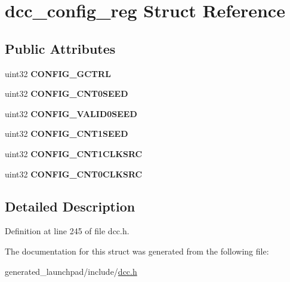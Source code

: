\hypertarget{structdcc__config__reg}{}\section{dcc\+\_\+config\+\_\+reg Struct Reference}
\label{structdcc__config__reg}
\subsection*{Public Attributes}
\begin{DoxyCompactItemize}
\item 
\mbox{\label{structdcc__config__reg_a8f7e1439184c35b567b12efd426e41fb}} 
uint32 {\bfseries C\+O\+N\+F\+I\+G\+\_\+\+G\+C\+T\+RL}
\item 
\mbox{\label{structdcc__config__reg_acd374e538423583537034cb9b4633c55}} 
uint32 {\bfseries C\+O\+N\+F\+I\+G\+\_\+\+C\+N\+T0\+S\+E\+ED}
\item 
\mbox{\label{structdcc__config__reg_afdf5149c435370be1d52d63de100e86e}} 
uint32 {\bfseries C\+O\+N\+F\+I\+G\+\_\+\+V\+A\+L\+I\+D0\+S\+E\+ED}
\item 
\mbox{\label{structdcc__config__reg_a1601f015af2f53987759b7eca1f4b579}} 
uint32 {\bfseries C\+O\+N\+F\+I\+G\+\_\+\+C\+N\+T1\+S\+E\+ED}
\item 
\mbox{\label{structdcc__config__reg_a5d3efe4834e7c7984bea2eeaf8605243}} 
uint32 {\bfseries C\+O\+N\+F\+I\+G\+\_\+\+C\+N\+T1\+C\+L\+K\+S\+RC}
\item 
\mbox{\label{structdcc__config__reg_abf38b42add13707abd174dd9d443b989}} 
uint32 {\bfseries C\+O\+N\+F\+I\+G\+\_\+\+C\+N\+T0\+C\+L\+K\+S\+RC}
\end{DoxyCompactItemize}


\subsection{Detailed Description}


Definition at line 245 of file dcc.\+h.



The documentation for this struct was generated from the following file\+:\begin{DoxyCompactItemize}
\item 
generated\+\_\+launchpad/include/\mbox{\hyperlink{dcc_8h}{dcc.\+h}}\end{DoxyCompactItemize}
